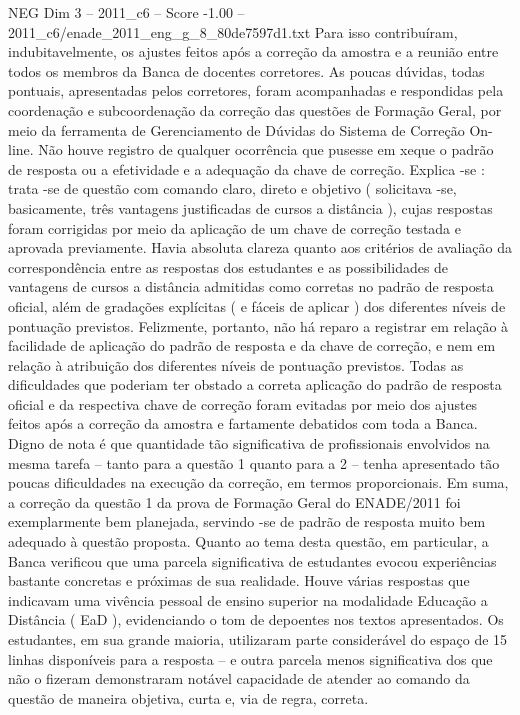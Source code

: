 \begin{textsample}{NEG Dim 3 – 2011\_c6 – Score -1.00 – 2011\_c6/enade\_2011\_eng\_g\_8\_80de7597d1.txt}
Para isso contribuíram, indubitavelmente, os ajustes feitos após a correção da amostra e a reunião entre todos os membros da Banca de docentes corretores.
As poucas dúvidas, todas pontuais, apresentadas pelos corretores, foram acompanhadas e respondidas pela coordenação e subcoordenação da correção das questões de Formação Geral, por meio da ferramenta de Gerenciamento de Dúvidas do Sistema de Correção On-line.
Não houve registro de qualquer ocorrência que pusesse em xeque o padrão de resposta ou a efetividade e a adequação da chave de correção.
Explica -se : trata -se de questão com comando claro, direto e objetivo ( solicitava -se, basicamente, três vantagens justificadas de cursos a distância ), cujas respostas foram corrigidas por meio da aplicação de um chave de correção testada e aprovada previamente.
Havia absoluta clareza quanto aos critérios de avaliação da correspondência entre as respostas dos estudantes e as possibilidades de vantagens de cursos a distância admitidas como corretas no padrão de resposta oficial, além de gradações explícitas ( e fáceis de aplicar ) dos diferentes níveis de pontuação previstos.
Felizmente, portanto, não há reparo a registrar em relação à facilidade de aplicação do padrão de resposta e da chave de correção, e nem em relação à atribuição dos diferentes níveis de pontuação previstos.
Todas as dificuldades que poderiam ter obstado a correta aplicação do padrão de resposta oficial e da respectiva chave de correção foram evitadas por meio dos ajustes feitos após a correção da amostra e fartamente debatidos com toda a Banca.
Digno de nota é que quantidade tão significativa de profissionais envolvidos na mesma tarefa – tanto para a questão 1 quanto para a 2 – tenha apresentado tão poucas dificuldades na execução da correção, em termos proporcionais.
Em suma, a correção da questão 1 da prova de Formação Geral do ENADE/2011 foi exemplarmente bem planejada, servindo -se de padrão de resposta muito bem adequado à questão proposta.
Quanto ao tema desta questão, em particular, a Banca verificou que uma parcela significativa de estudantes evocou experiências bastante concretas e próximas de sua realidade.
Houve várias respostas que indicavam uma vivência pessoal de ensino superior na modalidade Educação a Distância ( EaD ), evidenciando o tom de depoentes nos textos apresentados.
Os estudantes, em sua grande maioria, utilizaram parte considerável do espaço de 15 linhas disponíveis para a resposta – e outra parcela menos significativa dos que não o fizeram demonstraram notável capacidade de atender ao comando da questão de maneira objetiva, curta e, via de regra, correta.

\end{textsample}
